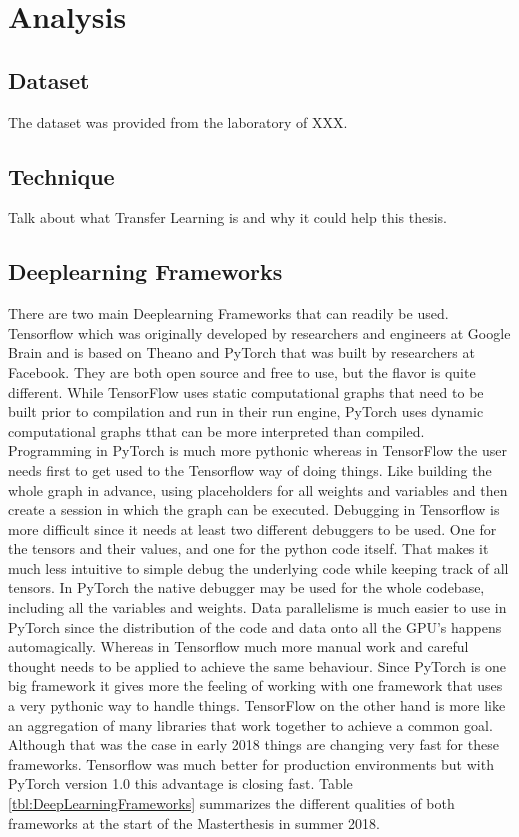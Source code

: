 \chapter{Analysis}

\section{Dataset}

The dataset was provided from the laboratory of XXX.

\section{Technique}

Talk about what Transfer Learning is and why it could help this thesis.

\section{Deeplearning Frameworks}

There are two main Deeplearning Frameworks that can readily be used. Tensorflow which was originally developed by researchers and engineers at Google Brain and is based on Theano and PyTorch that was built by researchers at Facebook. They are both open source and free to use, but the flavor is quite different. While TensorFlow uses static computational graphs that need to be built prior to compilation and run in their run engine, PyTorch uses dynamic computational graphs tthat can be more interpreted than compiled. Programming in PyTorch is much more pythonic whereas in TensorFlow the user needs first to get used to the Tensorflow way of doing things. Like building the whole graph in advance, using placeholders for all weights and variables and then create a session in which the graph can be executed. Debugging in Tensorflow is more difficult since it needs at least two different debuggers to be used. One for the tensors and their values, and one for the python code itself. That makes it much less intuitive to simple debug the underlying code while keeping track of all tensors. In PyTorch the native debugger may be used for the whole codebase, including all the variables and weights. Data parallelisme is much easier to use in PyTorch since the distribution of the code and data onto all the GPU's happens automagically. Whereas in Tensorflow much more manual work and careful thought needs to be applied to achieve the same behaviour. Since PyTorch is one big framework it gives more the feeling of working with one framework that uses a very pythonic way to handle things. TensorFlow on the other hand is more like an aggregation of many libraries that work together to achieve a common goal. Although that was the case in early 2018 things are changing very fast for these frameworks. Tensorflow was much better for production environments but with PyTorch version 1.0 this advantage is closing fast. Table \ref{tbl:DeepLearningFrameworks} summarizes the different qualities of  both frameworks at the start of the Masterthesis in summer 2018.

